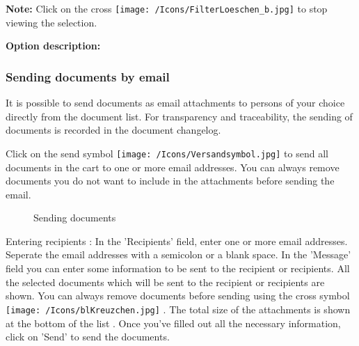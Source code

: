 \textbf{Note:} Click on the cross \texttt{[image: /Icons/FilterLoeschen\_b.jpg]}  to stop viewing the selection. 

\vspace{\baselineskip}

\textbf{Option description:}

\subsubsection{Sending documents by email}
\label{bkm:Ref201701127}

It is possible to send documents as email attachments to persons of your choice directly from the document list. For transparency and traceability, the sending of documents is recorded in the document changelog.

Click on the send symbol \texttt{[image: /Icons/Versandsymbol.jpg]} to send all documents in the cart to one or more email addresses. You can always remove documents you do not want to include in the attachments before sending the email.

\begin{figure}[H]
\caption{Sending documents}
\end{figure}

Entering recipients : In the 'Recipients' field, enter one or more email addresses. Seperate the email addresses with a semicolon or a blank space.
In the 'Message' field  you can enter some information to be sent to the recipient or recipients. All the selected documents which will be sent to the recipient or recipients are shown. You can always remove documents before sending using the cross symbol \texttt{[image: /Icons/blKreuzchen.jpg]} . The total size of the attachments is shown at the bottom of the list . Once you've filled out all the necessary information, click on 'Send'  to send the documents.


